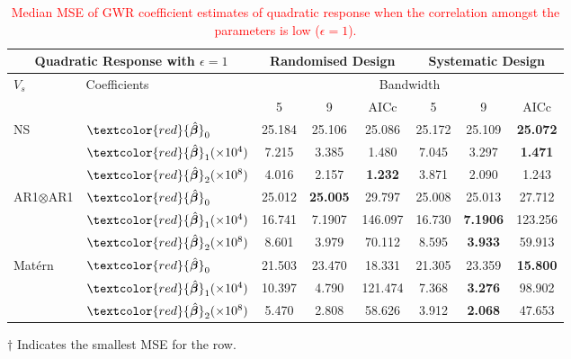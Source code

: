 \documentclass[a4paper]{article} 	%
\newcommand{\Matern}{Mat\'ern }
\newcommand{\zc}[1]{\textcolor{red}{#1}}
\begin{document}
\begin{table}[!htp]
\centering
\begin{threeparttable}
\caption{\zc{Median MSE of GWR coefficient estimates of quadratic response when the correlation amongst the parameters is low ($\epsilon=1$).}}\label{tb:MSEquadratic}
\begin{tabular}{ll|ccc|ccc}
\toprule
\multicolumn{2}{c}{Quadratic Response with $\epsilon=1$} & \multicolumn{3}{c}{Randomised Design} & \multicolumn{3}{c}{Systematic Design} \\ \midrule
\multirow{2}{*}{$V_s$} & \multirow{2}{*}{Coefficients}  & \multicolumn{6}{c}{Bandwidth}\\ 
		  &  & 5  & 9  & AICc & 5  & 9  & AICc \\ \midrule
\multirow{3}{*}{NS}     & $\zc{\hat{\bm{\beta}}}_0$  & 25.184 & 25.106 & 25.086    & 25.172 & 25.109 & \bf{25.072}\tnote{$\dagger$}   \\
   &  $\zc{\hat{\bm{\beta}}}_1 (\times 10^4)$ & 7.215  & 3.385  & 1.480     & 7.045  & 3.297  & \bf{1.471}\tnote{$\dagger$}      \\
   & $\zc{\hat{\bm{\beta}}}_2 (\times 10^8)$ & 4.016  & 2.157  & \bf{1.232}\tnote{$\dagger$}     & 3.871  & 2.090  & 1.243     \\ \midrule
\multirow{3}{*}{AR1$\otimes$AR1} & $\zc{\hat{\bm{\beta}}}_0$  & 25.012     & \bf{25.005}\tnote{$\dagger$}  & 29.797    & 25.008 & 25.013 & 27.712    \\
   &  $\zc{\hat{\bm{\beta}}}_1 (\times 10^4)$  & 16.741 & 7.1907  & 146.097   & 16.730 & \bf{7.1906}\tnote{$\dagger$}   & 123.256   \\
   & $\zc{\hat{\bm{\beta}}}_2 (\times 10^8)$ & 8.601  & 3.979  & 70.112    & 8.595  & \bf{3.933}\tnote{$\dagger$}   & 59.913    \\ \midrule
\multirow{3}{*}{\Matern} & $\zc{\hat{\bm{\beta}}}_0$  & 21.503 & 23.470 & 18.331    & 21.305 & 23.359 & \bf{15.800}\tnote{$\dagger$}      \\
   & $\zc{\hat{\bm{\beta}}}_1 (\times 10^4)$  & 10.397 & 4.790  & 121.474   & 7.368  & \bf{3.276}\tnote{$\dagger$}    & 98.902    \\
   & $\zc{\hat{\bm{\beta}}}_2 (\times 10^8)$ & 5.470  & 2.808  & 58.626    & 3.912  & \bf{2.068}\tnote{$\dagger$}   & 47.653    \\ 
   \bottomrule
\end{tabular}
\begin{tablenotes}
\item[$\dagger$] \footnotesize Indicates the smallest MSE for the row.
\end{tablenotes}
\end{threeparttable}
\end{table}
\end{document}
